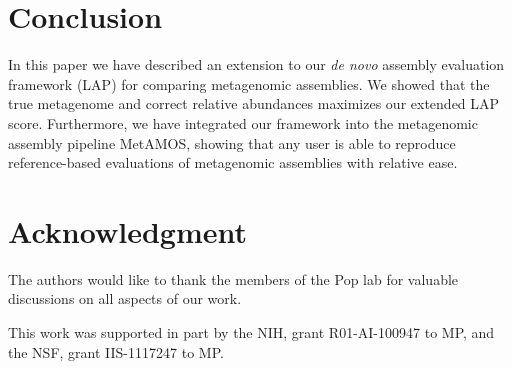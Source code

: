 \documentclass[conference]{IEEEtran}
\begin{document}
\section{Conclusion}
In this paper we have described an extension to our \emph{de novo} assembly evaluation framework (LAP) for comparing metagenomic assemblies.
We showed that the true metagenome and correct relative abundances maximizes our extended LAP score.
Furthermore, we have integrated our framework into the metagenomic assembly pipeline MetAMOS, showing that any user is able to reproduce reference-based evaluations of metagenomic assemblies with relative ease.




\section*{Acknowledgment}

The authors would like to thank the members of the Pop lab for valuable discussions on all aspects of our work.

This work was supported in part by the NIH, grant R01-AI-100947 to MP,
and the NSF, grant IIS-1117247 to MP.





%
%
%





\end{document}
